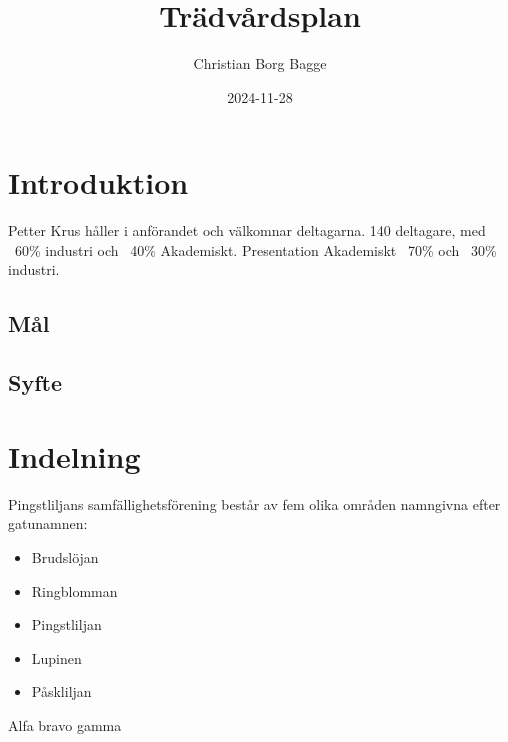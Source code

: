 \documentclass[12pt,a4paper]{article}
\author{Christian Borg Bagge}
\title{Trädvårdsplan}
\date{2024-11-28}
\begin{document}
\maketitle

\section{Introduktion} 
\label{sec:introduktion}

Petter Krus håller i anförandet och välkomnar deltagarna.
140 deltagare, med ~60\% industri och ~40\% Akademiskt. 
Presentation Akademiskt ~70\% och ~30\% industri.


\subsection{Mål}

\subsection{Syfte}

\section{Indelning}
Pingstliljans samfällighetsförening består av fem olika områden namngivna efter gatunamnen: 

\begin{minipage}{0.5\textwidth}
\vspace{2mm}
\begin{itemize}
	\item Brudslöjan
	\item Ringblomman
	\item Pingstliljan
	\item Lupinen
	\item Påskliljan 
\end{itemize}
\end{minipage}%
\begin{minipage}{0.5\textwidth}
Alfa bravo gamma
\end{minipage}
\end{document}
